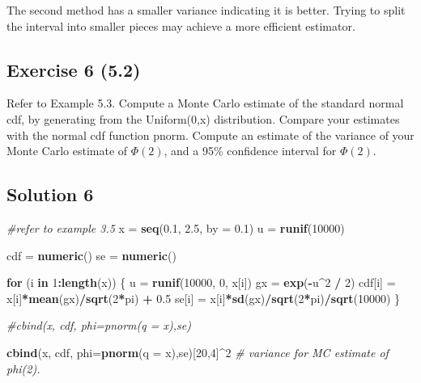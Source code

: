 \documentclass[
]{article}
\newenvironment{Shaded}{\begin{snugshade}}{\end{snugshade}}
\newcommand{\CommentTok}[1]{\textcolor[rgb]{0.56,0.35,0.01}{\textit{#1}}}
\newcommand{\ControlFlowTok}[1]{\textcolor[rgb]{0.13,0.29,0.53}{\textbf{#1}}}
\newcommand{\DataTypeTok}[1]{\textcolor[rgb]{0.13,0.29,0.53}{#1}}
\newcommand{\DecValTok}[1]{\textcolor[rgb]{0.00,0.00,0.81}{#1}}
\newcommand{\FloatTok}[1]{\textcolor[rgb]{0.00,0.00,0.81}{#1}}
\newcommand{\KeywordTok}[1]{\textcolor[rgb]{0.13,0.29,0.53}{\textbf{#1}}}
\newcommand{\NormalTok}[1]{#1}
\newcommand{\OperatorTok}[1]{\textcolor[rgb]{0.81,0.36,0.00}{\textbf{#1}}}
\newcommand{\StringTok}[1]{\textcolor[rgb]{0.31,0.60,0.02}{#1}}
\begin{document}
The second method has a smaller variance indicating it is better. Trying
to split the interval into smaller pieces may achieve a more efficient
estimator.

\hypertarget{exercise-6-5.2}{%
\subsection{Exercise 6 (5.2)}\label{exercise-6-5.2}}

Refer to Example 5.3. Compute a Monte Carlo estimate of the standard
normal cdf, by generating from the Uniform(0,x) distribution. Compare
your estimates with the normal cdf function pnorm. Compute an estimate
of the variance of your Monte Carlo estimate of \(\Phi(2)\), and a 95\%
confidence interval for \(\Phi(2)\).

\hypertarget{solution-6}{%
\subsection{Solution 6}\label{solution-6}}

\begin{Shaded}
\begin{Highlighting}[]
\CommentTok{#refer to example 3.5}
\NormalTok{x =}\StringTok{ }\KeywordTok{seq}\NormalTok{(}\FloatTok{0.1}\NormalTok{, }\FloatTok{2.5}\NormalTok{, }\DataTypeTok{by =} \FloatTok{0.1}\NormalTok{)}
\NormalTok{u =}\StringTok{ }\KeywordTok{runif}\NormalTok{(}\DecValTok{10000}\NormalTok{)}

\NormalTok{cdf =}\StringTok{ }\KeywordTok{numeric}\NormalTok{()}
\NormalTok{se =}\StringTok{ }\KeywordTok{numeric}\NormalTok{()}

\ControlFlowTok{for}\NormalTok{ (i }\ControlFlowTok{in} \DecValTok{1}\OperatorTok{:}\KeywordTok{length}\NormalTok{(x)) \{}
\NormalTok{  u =}\StringTok{ }\KeywordTok{runif}\NormalTok{(}\DecValTok{10000}\NormalTok{, }\DecValTok{0}\NormalTok{, x[i])}
\NormalTok{  gx =}\StringTok{ }\KeywordTok{exp}\NormalTok{(}\OperatorTok{-}\NormalTok{u}\OperatorTok{^}\DecValTok{2} \OperatorTok{/}\StringTok{ }\DecValTok{2}\NormalTok{)}
\NormalTok{  cdf[i] =}\StringTok{ }\NormalTok{x[i]}\OperatorTok{*}\KeywordTok{mean}\NormalTok{(gx)}\OperatorTok{/}\KeywordTok{sqrt}\NormalTok{(}\DecValTok{2}\OperatorTok{*}\NormalTok{pi) }\OperatorTok{+}\StringTok{ }\FloatTok{0.5}
\NormalTok{  se[i] =}\StringTok{ }\NormalTok{x[i]}\OperatorTok{*}\KeywordTok{sd}\NormalTok{(gx)}\OperatorTok{/}\KeywordTok{sqrt}\NormalTok{(}\DecValTok{2}\OperatorTok{*}\NormalTok{pi)}\OperatorTok{/}\KeywordTok{sqrt}\NormalTok{(}\DecValTok{10000}\NormalTok{)}
\NormalTok{\}}

\CommentTok{#cbind(x, cdf,   phi=pnorm(q = x),se)}

\KeywordTok{cbind}\NormalTok{(x, cdf,   }\DataTypeTok{phi=}\KeywordTok{pnorm}\NormalTok{(}\DataTypeTok{q =}\NormalTok{ x),se)[}\DecValTok{20}\NormalTok{,}\DecValTok{4}\NormalTok{]}\OperatorTok{^}\DecValTok{2} \CommentTok{# variance for MC estimate of phi(2).}
\end{Highlighting}
\end{Shaded}
\end{document}
